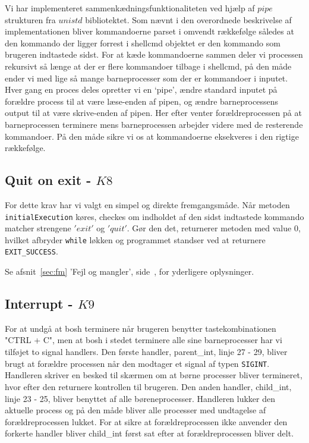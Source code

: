\documentclass[final]{article}
\begin{document}
Vi har implementeret sammenkædningsfunktionaliteten ved hjælp af $pipe$ strukturen fra $unistd$ bibliotektet. Som nævnt i den overordnede beskrivelse af implementationen bliver kommandoerne parset i omvendt rækkefølge således at den kommando der ligger forrest i shellcmd objektet er den kommando som brugeren indtastede sidst. For at kæde kommandoerne sammen deler vi processen rekursivt så længe at der er flere kommandoer tilbage i shellcmd, på den måde ender vi med lige så mange barneprocesser som der er kommandoer i inputet. Hver gang en proces deles opretter vi en ‘pipe’, ændre standard inputet på forældre process til at være læse-enden af pipen, og ændre barneprocessens output til at være skrive-enden af pipen. Her efter venter forældreprocessen på at barneprocessen terminere mens barneprocessen arbejder videre med de resterende kommandoer. På den måde sikre vi os at kommandoerne eksekveres i den rigtige rækkefølge. 

\subsection{Quit on exit - $K8$}
For dette krav har vi valgt en simpel og direkte fremgangsmåde. Når metoden \texttt{initialExecution} køres, checkes om indholdet af den sidst indtastede kommando matcher strengene $'exit'$ og $'quit'$. Gør den det, returnerer metoden med value $0$, hvilket afbryder \texttt{while} løkken og programmet standser ved at returnere \texttt{EXIT\_SUCCESS}.

Se afsnit~\ref{sec:fm} 'Fejl og mangler', side~\pageref{sec:fm}, for yderligere oplysninger.

\subsection{Interrupt - $K9$}
For at undgå at bosh terminere når brugeren benytter tastekombinationen "CTRL + C", men at bosh i stedet terminere alle sine barneprocesser har vi tilføjet to signal handlers. Den første handler, parent\_int, linje 27 - 29, bliver brugt at forældre processen når den modtager et signal af typen \texttt{SIGINT}. Handleren skriver en besked til skærmen om at børne processer bliver termineret, hvor efter den returnere kontrollen til brugeren. 
Den anden handler, child\_int, linje 23 - 25, bliver benyttet af alle børeneprocesser. Handleren lukker den aktuelle process og på den måde bliver alle processer med undtagelse af forældreprocessen lukket. For at sikre at forældreprocessen ikke anvender den forkerte handler bliver child\_int først sat efter at forældreprocessen bliver delt.\\
\end{document}
